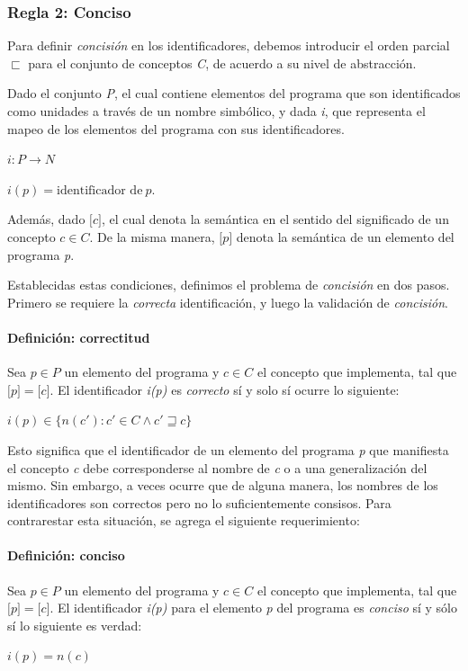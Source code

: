 \subsubsection{Regla 2: Conciso}
Para definir \textit{concisión} en los identificadores, debemos introducir el orden parcial $\sqsubset$ para el conjunto de conceptos \textit{C}, de acuerdo a su nivel de abstracción.

Dado el conjunto \textit{P}, el cual contiene elementos del programa que son identificados como unidades a través de un nombre simbólico, y dada \textit{i}, que representa el mapeo de los elementos del programa con sus identificadores.
\begin{center}
  $i : P \rightarrow N$
  
  $i(p) = \mbox{identificador de} \ p$.
\end{center}

Además, dado $\lbrack c \rbrack$, el cual denota la semántica en el sentido del significado de un concepto $c \in C$.
De la misma manera, $\lbrack p \rbrack$ denota la semántica de un elemento del programa \textit{p}.

Establecidas estas condiciones, definimos el problema de \textit{concisión} en dos pasos.
Primero se requiere la \textit{correcta} identificación, y luego la validación de \textit{concisión}.

\paragraph{Definición: correctitud}
Sea $p \in P$ un elemento del programa y $c \in C$ el concepto que implementa, tal que $\lbrack p \rbrack = \lbrack c \rbrack$.
El identificador \textit{i(p)} es \textit{correcto} sí y solo sí ocurre lo siguiente:
\begin{center}
  $i(p) \in \lbrace n(c') : c' \in C \land c' \sqsupseteq c \rbrace$
\end{center}

Esto significa que el identificador de un elemento del programa \textit{p} que manifiesta el concepto \textit{c} debe corresponderse al nombre de \textit{c} o a una generalización del mismo.
Sin embargo, a veces ocurre que de alguna manera, los nombres de los identificadores son correctos pero no lo suficientemente consisos.
Para contrarestar esta situación, se agrega el siguiente requerimiento:

\paragraph{Definición: conciso}
Sea $p \in P$ un elemento del programa y $c \in C$ el concepto que implementa, tal que $\lbrack p \rbrack = \lbrack c \rbrack$.
El identificador \textit{i(p)} para el elemento \textit{p} del programa es \textit{conciso} sí y sólo sí lo siguiente es verdad:
\begin{center}
  $i(p) = n(c)$
\end{center}

